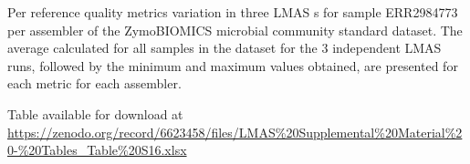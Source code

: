 \begin{table}[]
\centering
\caption{Per reference quality metrics variation in three LMAS s for sample ERR2984773 per assembler of the ZymoBIOMICS microbial community standard dataset. The average calculated for all samples in the dataset for the 3 independent LMAS runs, followed by the minimum and maximum values obtained, are presented for each metric for each assembler.}
\label{tab:ch5_suptable16}
Table available for download at \url{https://zenodo.org/record/6623458/files/LMAS\%20Supplemental\%20Material\%20-\%20Tables_Table\%20S16.xlsx}
\end{table}